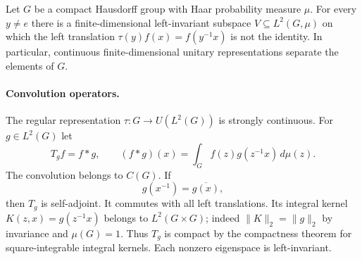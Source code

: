 
\begin{theorem}
Let $G$ be a compact Hausdorff group with Haar probability measure $\mu$.
For every $y\ne e$ there is a finite-dimensional left-invariant subspace
$V\subseteq L^2(G,\mu)$ on which the left translation
$\tau(y)f(x)=f(y^{-1}x)$ is not the identity. In particular, continuous
finite-dimensional unitary representations separate the elements of $G$.
\end{theorem}
\paragraph{Convolution operators.}
The regular representation $\tau:G\to U(L^2(G))$ is strongly continuous.
For $g\in L^2(G)$ let
\[
 T_gf=f*g,\qquad (f*g)(x)=\int_G f(z)g(z^{-1}x)\,d\mu(z).
\]
The convolution belongs to $C(G)$. If
\begin{equation}\label{selfadjoint-kernel}
 g(x^{-1})=\overline{g(x)},
\end{equation}
then $T_g$ is self-adjoint. It commutes with all left translations.
Its integral kernel $K(z,x)=g(z^{-1}x)$ belongs to $L^2(G\times G)$;
indeed $\|K\|_2=\|g\|_2$ by invariance and $\mu(G)=1$.
Thus $T_g$ is compact by the compactness theorem for square-integrable
integral kernels. Each nonzero eigenspace is left-invariant.

